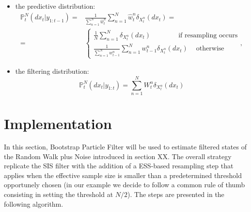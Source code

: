 \documentclass[
]{book}
\theoremstyle{break}
\theoremstyle{nonumberplain}
\begin{document}
\begin{itemize}
    \item the predictive distribution:
    \begin{equation}
    \begin{split}
        \mathbb P_t^N (dx_t|y_{1:t-1})=&\frac{1}{\sum_{n=1}^N\hat w_t^n}\sum_{n=1}^N\hat w_t^n\delta_{X_t^n}(dx_t)=\\
        =&\begin{cases}
        \frac{1}{N}\sum_{n=1}^N\delta_{X_t^n}(dx_t)
        ~~~~~~~~~~~~~~~~ ~\text{ if resampling occurs}\\
        \frac{1}{\sum_{n=1}^N w_{t-1}^n}\sum_{n=1}^Nw_{t-1}^n\delta_{X_t^n}(dx_t)~~~~ \text{ otherwise}
        \end{cases},
        \end{split}
    \end{equation}
    \item the filtering distribution:
    \begin{equation}
        \mathbb P_t^N (dx_t|y_{1:t})=\sum_{n=1}^NW_t^n\delta_{X_t^n}(dx_t)
    \end{equation}
\end{itemize}

\section{Implementation}

In this section, Bootstrap Particle Filter will be used to estimate
filtered states of the Random Walk plus Noise introduced in section XX.
The overall strategy replicate the SIS filter with the addition of a
ESS-based resampling step that applies when the effective sample size is
smaller than a predetermined threshold opportunely chosen (in our
example we decide to follow a common rule of thumb consisting in setting
the threshold at \(N/2\)). The steps are presented in the following
algorithm.
\end{document}
